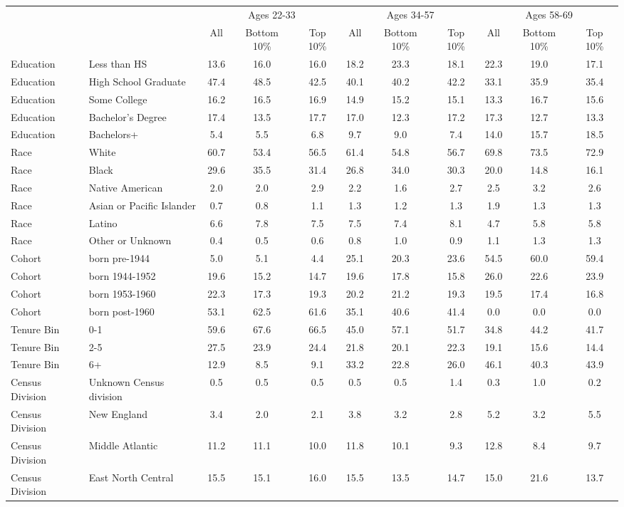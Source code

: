 \begin{tabular}{llccc|ccc|ccc}
\hline\hline
 & & \multicolumn{3}{c|}{Ages 22-33} & \multicolumn{3}{c|}{Ages 34-57} & \multicolumn{3}{c}{Ages 58-69} \\
 & & All & Bottom 10\% & Top 10\% & All & Bottom 10\% & Top 10\% & All & Bottom 10\% & Top 10\% \\
\hline
Education&Less than HS&13.6&16.0&16.0&18.2&23.3&18.1&22.3&19.0&17.1\\
Education&High School Graduate&47.4&48.5&42.5&40.1&40.2&42.2&33.1&35.9&35.4\\
Education&Some College&16.2&16.5&16.9&14.9&15.2&15.1&13.3&16.7&15.6\\
Education&Bachelor's Degree&17.4&13.5&17.7&17.0&12.3&17.2&17.3&12.7&13.3\\
Education&Bachelors+&5.4&5.5&6.8&9.7&9.0&7.4&14.0&15.7&18.5\\
Race&White&60.7&53.4&56.5&61.4&54.8&56.7&69.8&73.5&72.9\\
Race&Black&29.6&35.5&31.4&26.8&34.0&30.3&20.0&14.8&16.1\\
Race&Native American&2.0&2.0&2.9&2.2&1.6&2.7&2.5&3.2&2.6\\
Race&Asian or Pacific Islander&0.7&0.8&1.1&1.3&1.2&1.3&1.9&1.3&1.3\\
Race&Latino&6.6&7.8&7.5&7.5&7.4&8.1&4.7&5.8&5.8\\
Race&Other or Unknown&0.4&0.5&0.6&0.8&1.0&0.9&1.1&1.3&1.3\\
Cohort&born pre-1944&5.0&5.1&4.4&25.1&20.3&23.6&54.5&60.0&59.4\\
Cohort&born 1944-1952&19.6&15.2&14.7&19.6&17.8&15.8&26.0&22.6&23.9\\
Cohort&born 1953-1960&22.3&17.3&19.3&20.2&21.2&19.3&19.5&17.4&16.8\\
Cohort&born post-1960&53.1&62.5&61.6&35.1&40.6&41.4&0.0&0.0&0.0\\
Tenure Bin&0-1&59.6&67.6&66.5&45.0&57.1&51.7&34.8&44.2&41.7\\
Tenure Bin&2-5&27.5&23.9&24.4&21.8&20.1&22.3&19.1&15.6&14.4\\
Tenure Bin&6+&12.9&8.5&9.1&33.2&22.8&26.0&46.1&40.3&43.9\\
Census Division&Unknown Census division&0.5&0.5&0.5&0.5&0.5&1.4&0.3&1.0&0.2\\
Census Division&New England&3.4&2.0&2.1&3.8&3.2&2.8&5.2&3.2&5.5\\
Census Division&Middle Atlantic&11.2&11.1&10.0&11.8&10.1&9.3&12.8&8.4&9.7\\
Census Division&East North Central&15.5&15.1&16.0&15.5&13.5&14.7&15.0&21.6&13.7\\

\end{tabular}
